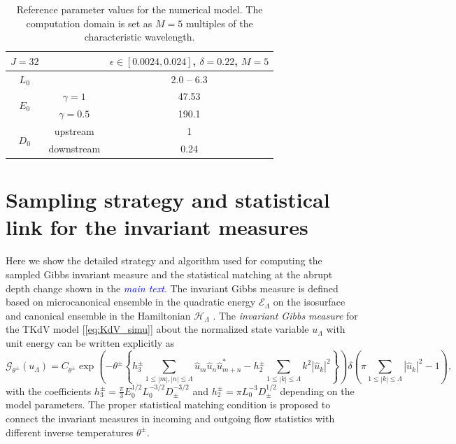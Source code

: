 \documentclass[9pt,twoside,lineno]{pnas-new}
\theoremstyle{plain}
\theoremstyle{plain}
\begin{document}
\begin{table}
\begin{centering}
\begin{tabular}{cccc}
\toprule 
$J=32$ &  & \multicolumn{2}{c}{$\epsilon\in\left[0.0024,0.024\right]$, $\delta=0.22$, $M=5$}\tabularnewline
\midrule
\midrule 
\multirow{1}{*}{$L_{0}$} &  & \multicolumn{2}{c}{2.0 -- 6.3}\tabularnewline
\midrule 
\multirow{2}{*}{$E_{0}$} & $\gamma=1$ & \multicolumn{2}{c}{47.53}\tabularnewline
\cmidrule{2-4} 
 & $\gamma=0.5$ & \multicolumn{2}{c}{190.1}\tabularnewline
\midrule 
\multirow{2}{*}{$D_{0}$} & upstream & \multicolumn{2}{c}{1}\tabularnewline
\cmidrule{2-4} 
 & downstream & \multicolumn{2}{c}{0.24}\tabularnewline
\bottomrule
\end{tabular}
\par\end{centering}
\caption{Reference parameter values for the numerical model. The computation
domain is set as $M=5$ multiples of the characteristic wavelength.\label{tab:Reference-parameter-values}}
\end{table}

\section{Sampling strategy and statistical link for the invariant measures}

Here we show the detailed strategy and algorithm used for computing
the sampled Gibbs invariant measure and the statistical matching at
the abrupt depth change shown in the \textcolor{blue}{\emph{main text}}. The invariant
Gibbs measure is defined based on microcanonical ensemble in the quadratic
energy $\mathcal{E}_{\Lambda}$ on the isosurface and canonical ensemble
in the Hamiltonian $\mathcal{H}_{\Lambda}$ \cite{majda2006nonlinear,bajars2013weakly}.
The \emph{invariant Gibbs measure} for the TKdV model [\ref{eq:KdV_simu}]
about the normalized state variable $u_{\Lambda}$ with unit energy
can be written explicitly as
\begin{equation}
\mathcal{G}_{\theta^{\pm}}\left(u_{\Lambda}\right)=C_{\theta^{\pm}}\exp\left(-\theta^{\pm}\left\{ h_{3}^{\pm}\sum_{1\leq\left|m\right|,\left|n\right|\leq\Lambda}\hat{u}_{m}\hat{u}_{n}\hat{u}_{m+n}^{*}-h_{2}^{\pm}\sum_{1\leq\left|k\right|\leq\Lambda}k^{2}\left|\hat{u}_{k}\right|^{2}\right\} \right)\delta\left(\pi\sum_{1\leq\left|k\right|\leq\Lambda}\left|\hat{u}_{k}\right|^{2}-1\right),\label{eq:gibbs}
\end{equation}
with the coefficients $h_{3}^{\pm}=\frac{\pi}{3}E_{0}^{1/2}L_{0}^{-3/2}D_{\pm}^{-3/2}$
and $h_{2}^{\pm}=\pi L_{0}^{-3}D_{\pm}^{1/2}$ depending on the model
parameters. The proper statistical matching condition is proposed to connect the
invariant measures in incoming and outgoing flow statistics with different
inverse temperatures $\theta^{\pm}$. 
\end{document}
